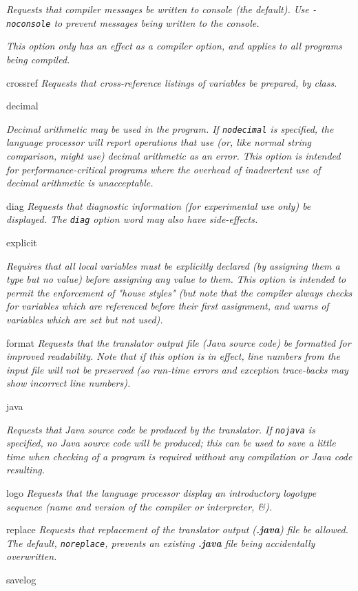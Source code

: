\begin{description}
\emph{Requests that compiler messages be written to console (the default).
Use \texttt{-noconsole} to prevent messages being written to the
console.}
 
\emph{This option only has an effect as a compiler option, and applies to all
programs being compiled.}
\item{crossref}
\emph{Requests that cross-reference listings of variables be prepared,
by class.}
\item{decimal}

\emph{Decimal arithmetic may be used in the program.  If \texttt{nodecimal} is
specified, the language processor will report operations that use (or,
like normal string comparison, might use) decimal arithmetic as an
error.  This option is intended for performance-critical programs where
the overhead of inadvertent use of decimal arithmetic is
unacceptable.}
\item{diag}
\emph{Requests that diagnostic information (for experimental use only)
be displayed.
The \texttt{diag} option word may also have side-effects.}
\item{explicit}

\emph{Requires that all local variables must be explicitly declared (by
assigning them a type but no value) before assigning any value to them.
This option is intended to permit the enforcement of "house styles"
(but note that the \nr{} compiler always checks for variables which
are referenced before their first assignment, and warns of variables
which are set but not used).}
\item{format}
\emph{Requests that the translator output file (Java source code) be
formatted for improved readability.
Note that if this option is in effect, line numbers from the input file
will not be preserved (so run-time errors and exception trace-backs may
show incorrect line numbers).}
\item{java}

\emph{Requests that Java source code be produced by the translator.
If \texttt{nojava} is specified, no Java source code will be produced;
this can be used to save a little time when checking of a program is
required without any compilation or Java code resulting.}
\item{logo}
\emph{Requests that the language processor display an introductory
logotype sequence (name and version of the compiler or interpreter,
\&).}
\item{replace}
\emph{Requests that replacement of the translator output
(\textbf{.java}) file be allowed.
The default, \texttt{noreplace}, prevents an existing \textbf{.java}
file being accidentally overwritten.}
\item{savelog}


\end{description}
